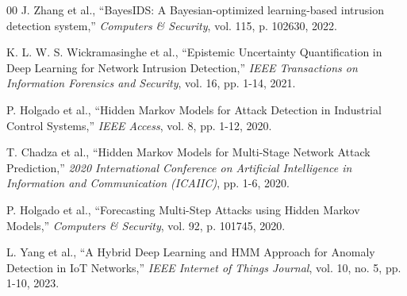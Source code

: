 \documentclass[conference]{IEEEtran}
\begin{document}
\begin{thebibliography}{00}
 J. Zhang et al., ``BayesIDS: A Bayesian-optimized learning-based intrusion detection system,'' \textit{Computers \& Security}, vol. 115, p. 102630, 2022.

 K. L. W. S. Wickramasinghe et al., ``Epistemic Uncertainty Quantification in Deep Learning for Network Intrusion Detection,'' \textit{IEEE Transactions on Information Forensics and Security}, vol. 16, pp. 1-14, 2021.

 P. Holgado et al., ``Hidden Markov Models for Attack Detection in Industrial Control Systems,'' \textit{IEEE Access}, vol. 8, pp. 1-12, 2020.

 T. Chadza et al., ``Hidden Markov Models for Multi-Stage Network Attack Prediction,'' \textit{2020 International Conference on Artificial Intelligence in Information and Communication (ICAIIC)}, pp. 1-6, 2020.

 P. Holgado et al., ``Forecasting Multi-Step Attacks using Hidden Markov Models,'' \textit{Computers \& Security}, vol. 92, p. 101745, 2020.

 L. Yang et al., ``A Hybrid Deep Learning and HMM Approach for Anomaly Detection in IoT Networks,'' \textit{IEEE Internet of Things Journal}, vol. 10, no. 5, pp. 1-10, 2023.

\end{thebibliography}
\end{document}
